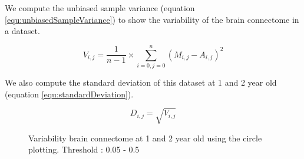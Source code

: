 \documentclass[]{spie}  %
\begin{document}
We compute the unbiased sample variance  (equation \ref{equ:unbiasedSampleVariance}) to show the variability of the brain connectome in a dataset. 

\begin{equation}
	V_{i,j} = \frac{1}{n-1} \times \sum_{i=0, j=0}^n {(M_{i,j} - A_{i,j})^2}
	\label{equ:unbiasedSampleVariance}
\end{equation}

We also compute the standard deviation of this dataset at 1 and 2 year old (equation \ref{equ:standardDeviation}).

\begin{equation}
	D_{i,j} = \sqrt{V_{i,j}}
	\label{equ:standardDeviation}
\end{equation}

\begin{figure}
\centering 
{}
\caption[Variability of brain connectome at 1 (a) and 2 (a) year old using the circle plotting ]{Variability brain connectome at 1 and 2 year old using the circle plotting. Threshold : 0.05 - 0.5 }
\label{fig:VariabilityBrainConnectome}
\end{figure} 
\end{document}
